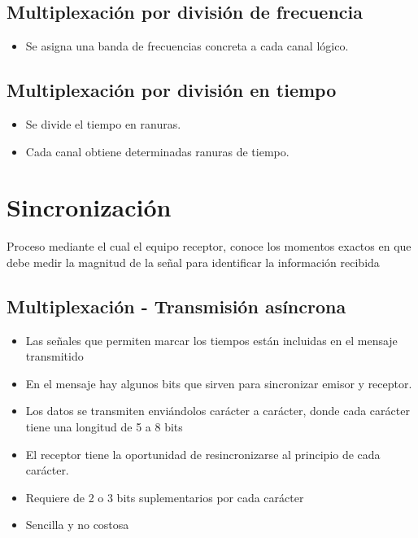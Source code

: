 \documentclass[11pt]{article}
\begin{document}
\subsection{Multiplexación por división de \textbf{frecuencia}}
\label{sec:orge4fa496}
\begin{itemize}
\item Se asigna una banda de frecuencias concreta a cada canal lógico.
\end{itemize}
\subsection{Multiplexación por división en \textbf{tiempo}}
\label{sec:org6ecdb90}
\begin{itemize}
\item Se divide el tiempo en ranuras.
\item Cada canal obtiene determinadas ranuras de tiempo.
\end{itemize}

\section{Sincronización}
\label{sec:orga2c4e2d}
Proceso mediante el cual el equipo receptor, conoce los momentos exactos en que debe medir la magnitud de la señal para identificar la información recibida

\subsection{Multiplexación - Transmisión \textbf{asíncrona}}
\label{sec:org171908d}
\begin{itemize}
\item Las señales que permiten marcar los tiempos están incluidas en el mensaje transmitido
\item En el mensaje hay algunos bits que sirven para sincronizar emisor y receptor.
\item Los datos se transmiten enviándolos carácter a carácter, donde cada carácter tiene una longitud de 5 a 8 bits
\item El receptor tiene la oportunidad de resincronizarse al principio de cada carácter.
\item Requiere de 2 o 3 bits suplementarios por cada carácter
\item Sencilla y no costosa
\end{itemize}
\end{document}

